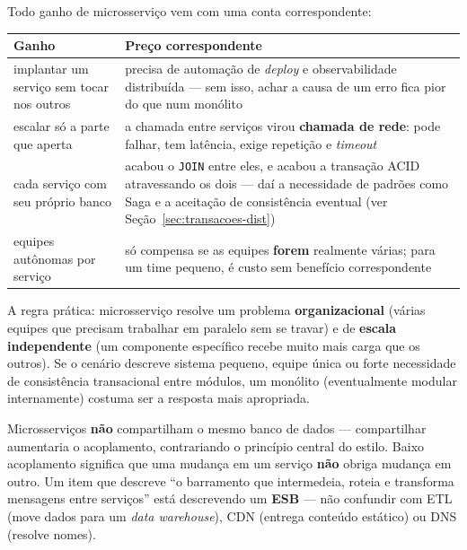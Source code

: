 \begin{conceito}
Todo ganho de microsserviço vem com uma conta correspondente:

\begin{center}
\begin{tabular}{@{}p{5.4cm}p{7cm}@{}}
\toprule
\textbf{Ganho} & \textbf{Preço correspondente} \\
\midrule
implantar um serviço sem tocar nos outros & precisa de automação de
\textit{deploy} e observabilidade distribuída --- sem isso, achar a causa
de um erro fica pior do que num monólito \\
escalar só a parte que aperta & a chamada entre serviços virou
\textbf{chamada de rede}: pode falhar, tem latência, exige repetição e
\textit{timeout} \\
cada serviço com seu próprio banco & acabou o \texttt{JOIN} entre eles, e
acabou a transação ACID atravessando os dois --- daí a necessidade de
padrões como Saga e a aceitação de consistência eventual (ver
Seção~\ref{sec:transacoes-dist}) \\
equipes autônomas por serviço & só compensa se as equipes \textbf{forem}
realmente várias; para um time pequeno, é custo sem benefício
correspondente \\
\bottomrule
\end{tabular}
\end{center}

A regra prática: microsserviço resolve um problema \textbf{organizacional}
(várias equipes que precisam trabalhar em paralelo sem se travar) e de
\textbf{escala independente} (um componente específico recebe muito mais
carga que os outros). Se o cenário descreve sistema pequeno, equipe única
ou forte necessidade de consistência transacional entre módulos, um
monólito (eventualmente modular internamente) costuma ser a resposta mais
apropriada.
\end{conceito}

\begin{cuidado}
Microsserviços \textbf{não} compartilham o mesmo banco de dados ---
compartilhar aumentaria o acoplamento, contrariando o princípio central do
estilo. Baixo acoplamento significa que uma mudança em um serviço
\textbf{não} obriga mudança em outro. Um item que descreve “o barramento
que intermedeia, roteia e transforma mensagens entre serviços” está
descrevendo um \textbf{ESB} --- não confundir com ETL (move dados para um
\textit{data warehouse}), CDN (entrega conteúdo estático) ou DNS (resolve
nomes).
\end{cuidado}

